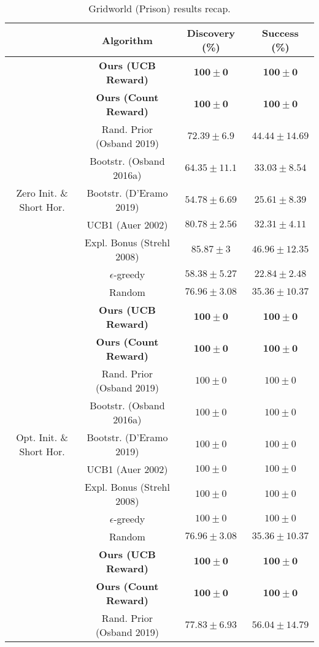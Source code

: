 \documentclass{article}
\begin{document}
\begin{table}[h]
\centering
\caption{Gridworld (Prison) results recap.}
\begin{tabular}{ c | c | c c }
 & Algorithm & Discovery (\%) & Success (\%) \\
 \hline
 & \textbf{Ours (UCB Reward)} & $\mathbf{100 \pm 0}$ & $\mathbf{100 \pm 0}$ \\
 & \textbf{Ours (Count Reward)} & $\mathbf{100 \pm 0}$ & $\mathbf{100 \pm 0}$ \\
 & Rand. Prior (Osband 2019) & $72.39 \pm 6.9$ & $44.44 \pm 14.69$ \\
 & Bootstr. (Osband 2016a) & $64.35 \pm 11.1$ & $33.03 \pm 8.54$ \\
 Zero Init. \& Short Hor. & Bootstr. (D'Eramo 2019) & $54.78 \pm 6.69$ & $25.61 \pm 8.39$ \\
 & UCB1 (Auer 2002) & $80.78 \pm 2.56$ & $32.31 \pm 4.11$ \\
 & Expl. Bonus (Strehl 2008) & $85.87 \pm 3$ & $46.96 \pm 12.35$ \\
 & $\epsilon$-greedy & $58.38 \pm 5.27$ & $22.84 \pm 2.48$ \\
 & Random & $76.96 \pm 3.08$ & $35.36 \pm 10.37$ \\
 \hline
 & \textbf{Ours (UCB Reward)} & $\mathbf{100 \pm 0}$ & $\mathbf{100 \pm 0}$ \\
 & \textbf{Ours (Count Reward)} & $\mathbf{100 \pm 0}$ & $\mathbf{100 \pm 0}$ \\
 & Rand. Prior (Osband 2019) & ${100 \pm 0}$ & ${100 \pm 0}$ \\
 & Bootstr. (Osband 2016a) & ${100 \pm 0}$ & ${100 \pm 0}$ \\
 Opt. Init. \& Short Hor. & Bootstr. (D'Eramo 2019) & ${100 \pm 0}$ & ${100 \pm 0}$ \\
 & UCB1 (Auer 2002) & $100 \pm 0$ & $100 \pm 0$ \\
 & Expl. Bonus (Strehl 2008) & ${100 \pm 0}$ & ${100 \pm 0}$ \\
 & $\epsilon$-greedy & ${100 \pm 0}$ & ${100 \pm 0}$ \\
 & Random & $76.96 \pm 3.08$ & $35.36 \pm 10.37$ \\
 \hline
 & \textbf{Ours (UCB Reward)} & $\mathbf{100 \pm 0}$ & $\mathbf{100 \pm 0}$ \\
 & \textbf{Ours (Count Reward)} & $\mathbf{100 \pm 0}$ & $\mathbf{100 \pm 0}$ \\
 & Rand. Prior (Osband 2019) & $77.83 \pm 6.93$ & $56.04 \pm 14.79$ \\

\end{tabular}
\end{table}
\end{document}
